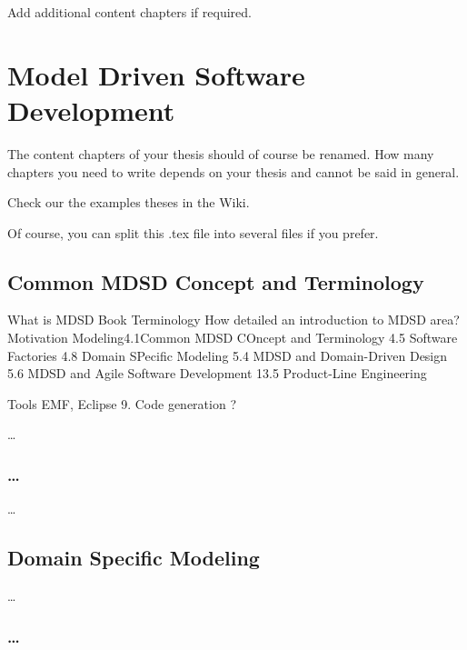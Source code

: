 
Add additional content chapters if required. \chapter{Model Driven Software Development}
\label{ch:Content1}

The content chapters of your thesis should of course be renamed. How many chapters you need to write depends on your thesis and cannot be said in general. 

Check our the examples theses in the Wiki. 

Of course, you can split this .tex file into several files if you prefer. 


\section{Common MDSD Concept and Terminology}
\label{ch:Content1:sec:Section1}

What is MDSD
Book 
Terminology
How detailed an introduction to MDSD area?
Motivation
	Modeling4.1Common MDSD COncept and Terminology
		4.5 Software Factories
			4.8 Domain SPecific Modeling
			5.4 MDSD and Domain-Driven Design
			5.6 MDSD and Agile Software Development
			13.5 Product-Line Engineering
			
			Tools EMF, Eclipse
			9. Code generation ?

\dots

\subsection{\ldots}
\label{ch:Content1:sec:Section1:subsec:SubSection1}

\dots


\section{Domain Specific Modeling}
\label{ch:Content1:sec:Section2}

\dots
\subsection{\ldots}
\label{ch:Content1:sec:Section2:subsec:SubSection1}

